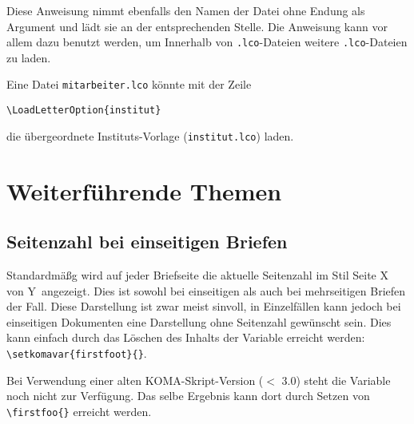 \begin{Declaration}
\end{Declaration}

Diese Anweisung nimmt ebenfalls den Namen der Datei ohne Endung als
Argument und lädt sie an der entsprechenden Stelle.
Die Anweisung kann vor allem dazu benutzt werden, um Innerhalb von
\texttt{.lco}-Dateien weitere \texttt{.lco}-Dateien zu laden.

\begin{example}
  Eine Datei \lstinline{mitarbeiter.lco} könnte mit der Zeile
\begin{lstlisting}
\LoadLetterOption{institut}
\end{lstlisting}
  die übergeordnete Instituts-Vorlage (\lstinline{institut.lco}) laden.
\end{example}

\section{Weiterführende Themen}

\subsection{Seitenzahl bei einseitigen Briefen}

Standardmäßg wird auf jeder Briefseite die aktuelle Seitenzahl
im Stil \glqq Seite X von Y\grqq\ angezeigt. Dies ist sowohl bei einseitigen
als auch bei mehrseitigen Briefen der Fall.
Diese Darstellung ist zwar meist sinvoll, in Einzelfällen kann jedoch bei
einseitigen Dokumenten eine Darstellung ohne Seitenzahl gewünscht sein.
Dies kann einfach durch das Löschen des Inhalts der Variable
 erreicht werden: \lstinline!\setkomavar{firstfoot}{}!.

\begin{important}
  Bei Verwendung einer alten KOMA-Skript-Version ($<$ 3.0) steht die
  Variable  noch nicht zur Verfügung.
  Das selbe Ergebnis kann dort durch Setzen von \lstinline!\firstfoo{}!
  erreicht werden.
\end{important}





